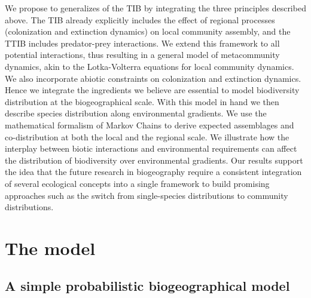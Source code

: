 We propose to generalizes of the TIB by integrating the three principles described above. The TIB already explicitly includes the effect of regional processes (colonization and extinction dynamics) on local community assembly, and the TTIB includes predator-prey interactions. We extend this framework to all potential interactions, thus resulting in a general model of metacommunity dynamics, akin to the Lotka-Volterra equations for local community dynamics. We also incorporate abiotic constraints on colonization and extinction dynamics. Hence we integrate the ingredients we believe are essential to model biodiversity distribution at the biogeographical scale. With this model in hand we then describe species distribution along environmental gradients. We use the mathematical formalism of Markov Chains \citep{kemeny1983finite, Black2012} to derive expected assemblages and co-distribution at both the local and the regional scale. We illustrate how the interplay between biotic interactions and environmental requirements can affect the distribution of biodiversity over environmental gradients. Our results support the idea that the future research in biogeography require a consistent integration of several ecological concepts into a single framework to build promising approaches such as the switch from single-species distributions to community distributions.

\section{The model}

\subsection{A simple probabilistic biogeographical model}

